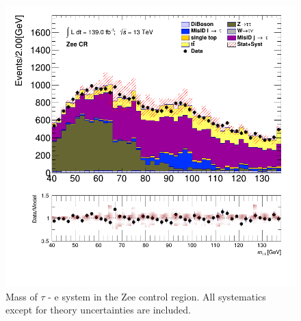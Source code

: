		\begin{figure}[!thp]
			\centering
			\includegraphics[width=.75\textwidth,keepaspectratio=true]{chapters/chapter6_HPlus/images/taulep/tau_0_lep_0_mass_ZEE.png}
			\caption{Mass of $\tau$ - e system in the Zee control region. All systematics except for \ttbar theory uncertainties are included.}
			\label{fig:zee-mass}
		\end{figure}

